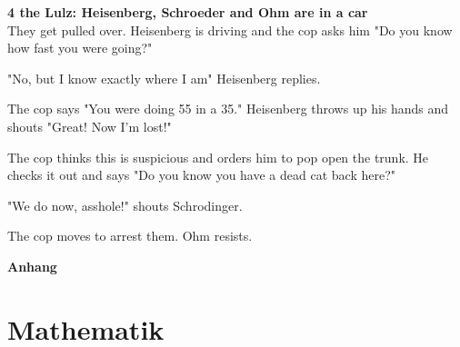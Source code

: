 \documentclass[fs, footer]{latex4ei}
\begin{document}
\begin{multicols*}{4}
\textbf{4 the Lulz: Heisenberg, Schroeder and Ohm are in a car}\\
They get pulled over. Heisenberg is driving and the cop asks him "Do you know how fast you were going?"

"No, but I know exactly where I am" Heisenberg replies.

The cop says "You were doing 55 in a 35." Heisenberg throws up his hands and shouts "Great! Now I'm lost!"

The cop thinks this is suspicious and orders him to pop open the trunk. He checks it out and says "Do you know you have a dead cat back here?"

"We do now, asshole!" shouts Schrodinger.

The cop moves to arrest them. Ohm resists.



\newpage
{\Huge \bf Anhang}


\section{Mathematik}





\end{multicols*}
\end{document}
